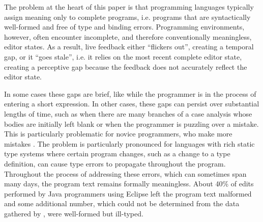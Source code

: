 %
The problem at the heart of this paper is that
programming languages typically assign meaning only to {complete programs}, i.e. programs that are syntactically well-formed and free of type and binding errors. Programming environments, however, often encounter incomplete, and therefore conventionally meaningless, editor states. As a result, live feedback either ``flickers out'', creating a temporal gap, or it ``goes stale'', i.e. it relies on the most recent complete editor state, creating a perceptive gap because the feedback does not accurately reflect the editor state.

In some cases these gaps are brief, like while the programmer
is in the process of entering  
a short expression. In other cases, these gaps can persist over substantial lengths of time, such as when there are many branches of a case analysis whose bodies are initially left blank or when the programmer is puzzling over a mistake.
%
This is particularly problematic for novice programmers, who make more mistakes \cite{mccauley2008debugging,fitzgerald2008debugging}.
%
The problem is particularly pronounced for languages with rich static type systems where certain program changes, such as a change to a type definition, can cause type errors to propagate throughout the program. Throughout the process of addressing these errors, which can sometimes span many days, the program text remains formally meaningless. 
About 40\% of edits performed by Java programmers using Eclipse left the program text malformed \cite{popl-paper} and some additional number, which could not be determined from the data gathered by \citet{6883030}, were well-formed but ill-typed.


